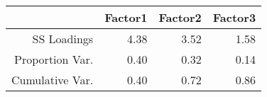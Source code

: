 \begin{tabular}{rrrr}
  \hline
 & Factor1 & Factor2 & Factor3 \\ 
  \hline
SS Loadings & 4.38 & 3.52 & 1.58 \\ 
  Proportion Var. & 0.40 & 0.32 & 0.14 \\ 
  Cumulative Var. & 0.40 & 0.72 & 0.86 \\ 
   \hline
\end{tabular}

